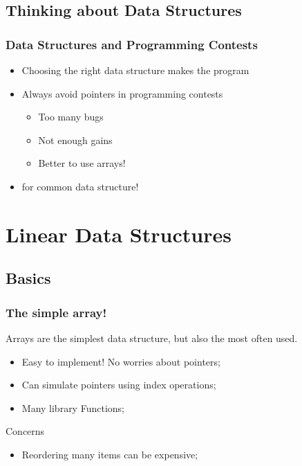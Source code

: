\documentclass{beamer}
\begin{document}
\subsection{Thinking about Data Structures}
\begin{frame}
  \frametitle{Data Structures and Programming Contests}
  \begin{itemize}
    \item Choosing the right data structure makes the program 

    \vfill

    \item Always avoid pointers \alert{in programming contests}
    \begin{itemize}
      \item Too many bugs
      \item Not enough gains
      \item Better to use arrays!
    \end{itemize}

    \bigskip

    \item {} for common data structure!
  \end{itemize}
\end{frame}


\section{Linear Data Structures}
\subsection{Basics}

\begin{frame}
  \frametitle{The simple array!}
  Arrays are the simplest data structure, but also the most often used.

  \bigskip

  \begin{itemize}
  \item Easy to implement! No worries about pointers;
  \item Can simulate pointers using index operations;
  \item Many library Functions;
  \end{itemize}

  \bigskip

  \alert{Concerns}
  \begin{itemize}
  \item Reordering many items can be expensive;
  \end{itemize}
\end{frame}
\end{document}
